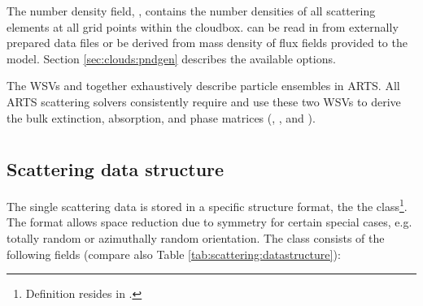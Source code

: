 The number density field, , contains the number densities
of all scattering elements at all grid points within the cloudbox.  can be read in from externally prepared data files or be derived from mass density of flux fields provided to the model. Section \ref{sec:clouds:pndgen} describes the available options.

The WSVs  and  together exhaustively
describe particle ensembles in ARTS. All ARTS scattering solvers consistently require and use these two WSVs to derive the bulk extinction, absorption, and phase matrices (, , and \PhaMat).


\section{}
\label{sec:clouds:ssp}

\subsection{Scattering data structure}
\label{sec:clouds:ARTS_SSP_structure}
 
The single scattering data is stored in a specific structure format, the
the  class\footnote{Definition resides in
.}. The format allows space reduction due to
symmetry for certain special cases, e.g. totally random or azimuthally random
orientation. The class consists of the following fields (compare also Table
\ref{tab:scattering:datastructure}):


